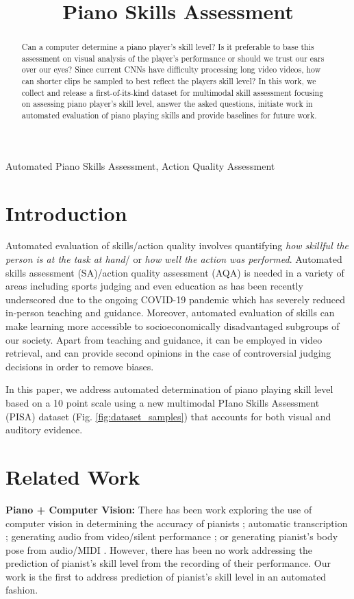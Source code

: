 \documentclass{article}
\title{Piano Skills Assessment}
\begin{document}
\maketitle
\begin{abstract}
Can a computer determine a piano player's skill level? Is it preferable to base this assessment on visual analysis of the player's performance or should we trust our ears over our eyes? Since current CNNs have difficulty processing long video videos, how can shorter clips be sampled to best reflect the players skill level? In this work, we collect and release a first-of-its-kind dataset for multimodal skill assessment focusing on assessing piano player's skill level, answer the asked questions, initiate work in automated evaluation of piano playing skills and provide baselines for future work.
\end{abstract}
\begin{keywords}
Automated Piano Skills Assessment, Action Quality Assessment
\end{keywords} \section{Introduction}
\label{sec:introduction}
Automated evaluation of skills/action quality involves quantifying \textit{how skillful the person is at the task at hand}/ or \textit{how well the action was performed}. Automated skills assessment (SA)/action quality assessment (AQA) is needed in a variety of areas including sports judging and even education as has been recently underscored due to the ongoing COVID-19 pandemic which has severely reduced in-person teaching and guidance. Moreover, automated evaluation of skills can make learning more accessible to socioeconomically disadvantaged subgroups of our society. Apart from teaching and guidance, it can be employed in video retrieval, and can provide second opinions in the case of controversial judging decisions in order to remove biases.

In this paper, we address automated determination of piano playing skill level based on a 10 point scale using a new multimodal PIano Skills Assessment (PISA) dataset (Fig. \ref{fig:dataset_samples}) that accounts for both visual and auditory evidence. \section{Related Work}

\textbf{Piano + Computer Vision:} There has been work exploring the use of computer vision in determining the accuracy of pianists \cite{lee2019observing, takegawa2006design, gorodnichy2006detection, oka2013marker, suteparuk2014detection}; automatic transcription \cite{akbari2015real, deb2016image, li2018creating, koepke2020sight, li2020robust}; generating audio from video/silent performance \cite{kang2019virtual, su2020audeo, gan2020foley}; or generating pianist's body pose from audio/MIDI \cite{li2018skeleton}. However, there has been no work addressing the prediction of pianist's skill level from the recording of their performance. Our work is the first to address prediction of pianist's skill level in an automated fashion. 
\end{document}
